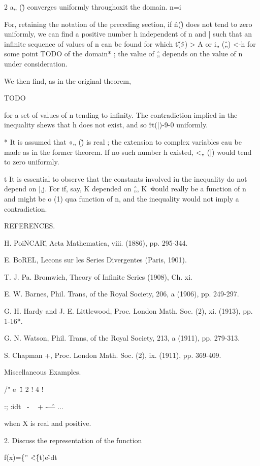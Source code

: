 2 a„ (\^) converges uniformly throughoxit the domain.
n=i

For, retaining the notation of the preceding section, if \^n(\^) does
not tend to zero uniformly, we can find a positive number h
independent of n and | such that an infinite sequence of values of n
can be found for which t\^ (\^») > A or i„ (\^„) <-h for some point
TODO of the domain* ; the value of \^„ depends on the value of n under
consideration.

We then find, as in the original theorem,

TODO

for a set of values of n tending to infinity. The contradiction
implied in the inequality shews that h does not exist, and so
\^rt(|)-9-0 uniformly.

* It is assumed that «„ (\^) is real ; the extension to complex
variables cau be made as in the former theorem. If no such number h
existed, <„ (|) would tend to zero uniformly.

t It is essential to observe that the constants involved iu the
inequality do not depend on |,j. For if, say, K depended on \^„, K~\^
would really be a function of n and might be o (1) qua function of n,
and the inequality would not imply a contradiction.

%
%

REFERENCES.

H. PoiNCAR\^, Acta Mathematica, viii. (1886), pp. 295-344.

E. BoREL, Lecons sur les Series Divergentes (Paris, 1901).

T. J. Pa. Bromwich, Theory of Infinite Series (1908), Ch. xi.

E. W. Barnes, Phil. Trans, of the Royal Society, 206, a (1906), pp. 249-297.

G. H. Hardy and J. E. Littlewood, Proc. London Math. Soc. (2), xi. (1913), pp. 1-16*.

G. N. Watson, Phil. Trans, of the Royal Society, 213, a (1911), pp. 279-313.

S. Chapman +, Proc. London Math. Soc. (2), ix. (1911), pp. 369-409.

Miscellaneous Examples.

/" e~\^ 1 2 ! 4 !

:; :idt~ - ~ + -\^ — ...

when X is real and positive.

2. Discuss the representation of the function

f(x)=\{'' \^<\^\{t)e\^-dt

